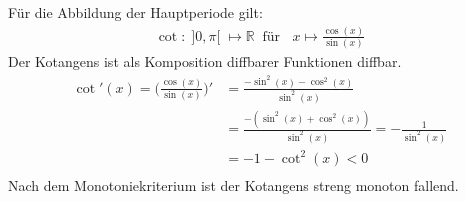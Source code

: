 Für die Abbildung der Hauptperiode gilt:\\
\begin{align*}
\cot:\;]0,\pi[ \;\longmapsto \mathbb{R}\;\;\text{für }\;\;x\longmapsto\frac{\cos(x)}{\sin(x)}
\end{align*}
Der Kotangens ist als Komposition diffbarer Funktionen diffbar.\\
\begin{align*}
\cot'(x)=\bigg(\frac{\cos(x)}{\sin(x)}\bigg)'&=\frac{-\sin^2(x)-\cos^2(x)}{\sin^2(x)}\\
&=\frac{-(\sin^2(x)+\cos^2(x))}{\sin^2(x)}=-\frac{1}{\sin^2(x)}\\
&=-1-\cot^2(x)<0\\
\end{align*}
Nach dem Monotoniekriterium ist der Kotangens streng monoton fallend.\\
